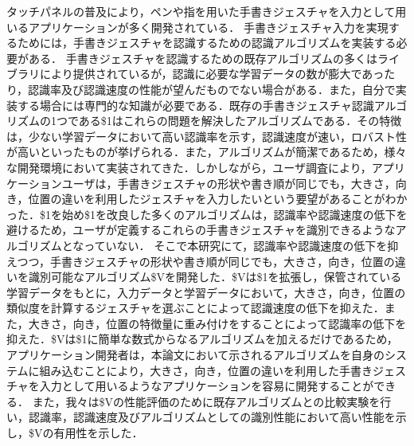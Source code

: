 タッチパネルの普及により，ペンや指を用いた手書きジェスチャを入力として用いるアプリケーションが多く開発されている．
手書きジェスチャ入力を実現するためには，手書きジェスチャを認識するための認識アルゴリズムを実装する必要がある．
手書きジェスチャを認識するための既存アルゴリズムの多くはライブラリにより提供されているが，認識に必要な学習データの数が膨大であったり，認識率及び認識速度の性能が望んだものでない場合がある．また，自分で実装する場合には専門的な知識が必要である．既存の手書きジェスチャ認識アルゴリズムの1つである\$1はこれらの問題を解決したアルゴリズムである．その特徴は，少ない学習データにおいて高い認識率を示す，認識速度が速い，ロバスト性が高いといったものが挙げられる．また，アルゴリズムが簡潔であるため，様々な開発環境において実装されてきた．しかしながら，ユーザ調査により，アプリケーションユーザは，手書きジェスチャの形状や書き順が同じでも，大きさ，向き，位置の違いを利用したジェスチャを入力したいという要望があることがわかった．\$1を始め\$1を改良した多くのアルゴリズムは，認識率や認識速度の低下を避けるため，ユーザが定義するこれらの手書きジェスチャを識別できるようなアルゴリズムとなっていない．
そこで本研究にて，認識率や認識速度の低下を抑えつつ，手書きジェスチャの形状や書き順が同じでも，大きさ，向き，位置の違いを識別可能なアルゴリズム\$Vを開発した．\$Vは\$1を拡張し，保管されている学習データをもとに，入力データと学習データにおいて，大きさ，向き，位置の類似度を計算するジェスチャを選ぶことによって認識速度の低下を抑えた．また，大きさ，向き，位置の特徴量に重み付けをすることによって認識率の低下を抑えた．\$Vは\$1に簡単な数式からなるアルゴリズムを加えるだけであるため，アプリケーション開発者は，本論文において示されるアルゴリズムを自身のシステムに組み込むことにより，大きさ，向き，位置の違いを利用した手書きジェスチャを入力として用いるようなアプリケーションを容易に開発することができる．
また，我々は\$Vの性能評価のために既存アルゴリズムとの比較実験を行い，認識率，認識速度及びアルゴリズムとしての識別性能において高い性能を示し，\$Vの有用性を示した．